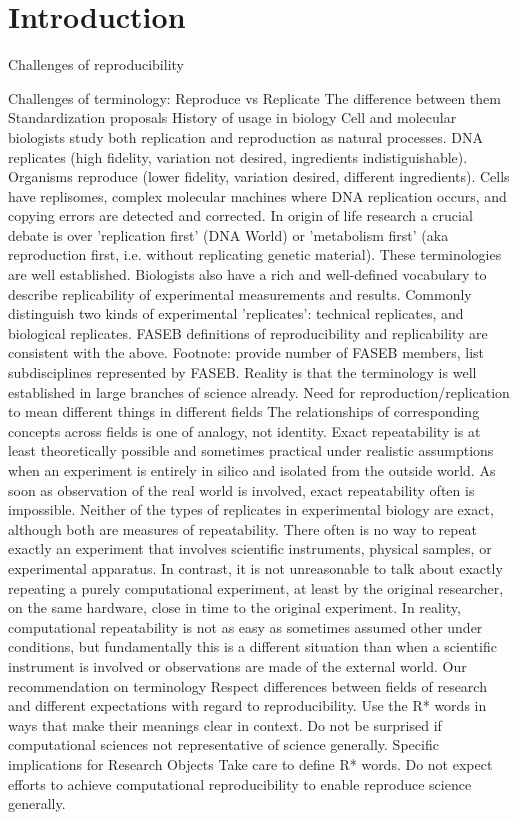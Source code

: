 \section{Introduction}

Challenges of reproducibility

	Challenges of terminology: Reproduce vs Replicate
		The difference between them
		Standardization proposals
		History of usage in biology
			Cell and molecular biologists study both replication and reproduction as natural processes.
			DNA replicates (high fidelity, variation not desired, ingredients indistiguishable).
			Organisms reproduce (lower fidelity, variation desired, different ingredients).
			Cells have replisomes, complex molecular machines where DNA replication occurs, and copying errors are detected and corrected.
			In origin of life research a crucial debate is over 'replication first' (DNA World) or 
 					'metabolism first' (aka reproduction first, i.e. without replicating genetic material).
			These terminologies are well established.
			Biologists also have a rich and well-defined vocabulary to describe replicability of experimental measurements and results.
			Commonly distinguish two kinds of experimental 'replicates':  technical replicates, and biological replicates.
			FASEB definitions of reproducibility and replicability are consistent with the above.
			Footnote: provide number of FASEB members, list subdisciplines represented by FASEB.
 				Reality is that the terminology is well established in large branches of science already.
		Need for reproduction/replication to mean different things in different fields
			The relationships of corresponding concepts across fields is one of analogy, not identity.
			Exact repeatability is at least theoretically possible and sometimes practical under realistic assumptions when an experiment 
				is entirely in silico and isolated from the outside world.
			As soon as observation of the real world is involved, exact repeatability often is impossible.
			Neither of the types of replicates in experimental biology are exact, although both are measures of repeatability.
			There often is no way to repeat exactly an experiment that involves scientific instruments, physical samples, or experimental apparatus.
			In contrast, it is not unreasonable to talk about exactly repeating a purely computational experiment, at least by the original researcher,
				on the same hardware, close in time to the original experiment.
			In reality, computational repeatability is not as easy as sometimes assumed other under conditions, but fundamentally this is
				a different situation than when a scientific instrument is involved or observations are made of the external world.
		Our recommendation on terminology
			Respect differences between fields of research and different expectations with regard to reproducibility.
			Use the R* words in ways that make their meanings clear in context.
			Do not be surprised if computational sciences not representative of science generally.
		Specific implications for Research Objects
			Take care to define R* words.
			Do not expect efforts to achieve computational reproducibility to enable reproduce science generally.

